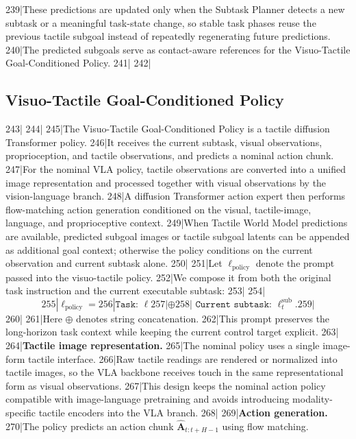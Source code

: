 239|These predictions are updated only when the Subtask Planner detects a new subtask or a meaningful task-state change, so stable task phases reuse the previous tactile subgoal instead of repeatedly regenerating future predictions.
240|The predicted subgoals serve as contact-aware references for the Visuo-Tactile Goal-Conditioned Policy.
241|
242|\subsection{Visuo-Tactile Goal-Conditioned Policy}
243|\label{sec:goal_conditioned_policy}
244|
245|The Visuo-Tactile Goal-Conditioned Policy is a tactile diffusion Transformer policy.
246|It receives the current subtask, visual observations, proprioception, and tactile observations, and predicts a nominal action chunk.
247|For the nominal VLA policy, tactile observations are converted into a unified image representation and processed together with visual observations by the vision-language branch.
248|A diffusion Transformer action expert then performs flow-matching action generation conditioned on the visual, tactile-image, language, and proprioceptive context.
249|When Tactile World Model predictions are available, predicted subgoal images or tactile subgoal latents can be appended as additional goal context; otherwise the policy conditions on the current observation and current subtask alone.
250|
251|Let $\ell_{\mathrm{policy}}$ denote the prompt passed into the visuo-tactile policy.
252|We compose it from both the original task instruction and the current executable subtask:
253|
254|\begin{equation}
255|    \ell_{\mathrm{policy}} =
256|    \texttt{Task: } \ell
257|    \oplus
258|    \texttt{ Current subtask: } \ell_t^{\mathrm{sub}}.
259|\end{equation}
260|
261|Here $\oplus$ denotes string concatenation.
262|This prompt preserves the long-horizon task context while keeping the current control target explicit.
263|
264|\noindent\textbf{Tactile image representation.}
265|The nominal policy uses a single image-form tactile interface.
266|Raw tactile readings are rendered or normalized into tactile images, so the VLA backbone receives touch in the same representational form as visual observations.
267|This design keeps the nominal action policy compatible with image-language pretraining and avoids introducing modality-specific tactile encoders into the VLA branch.
268|
269|\noindent\textbf{Action generation.}
270|The policy predicts an action chunk $\hat{\mathbf{A}}_{t:t+H-1}$ using flow matching.
